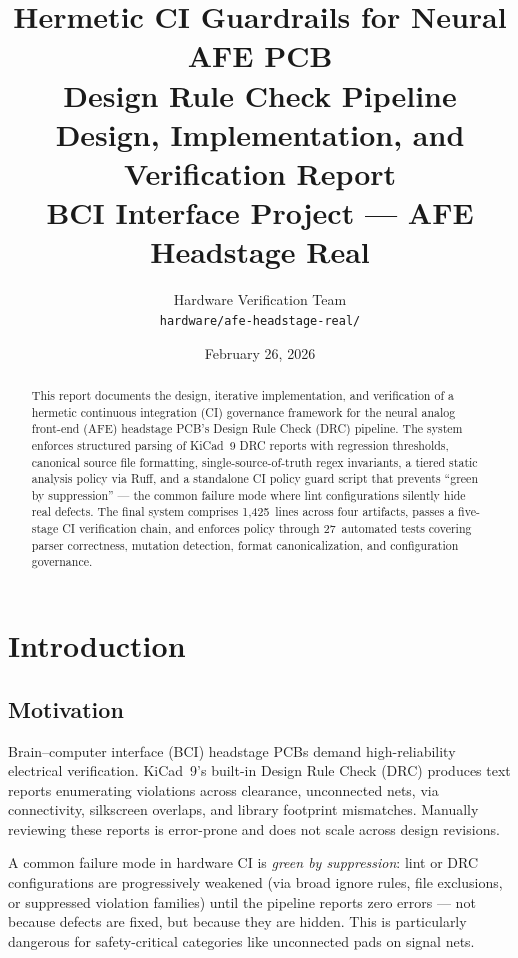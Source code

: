 \documentclass[11pt,a4paper]{article}
\title{%
    \textbf{Hermetic CI Guardrails for Neural AFE PCB\\Design Rule Check Pipeline}\\[0.5em]
    \large Design, Implementation, and Verification Report\\[0.3em]
    \normalsize BCI Interface Project --- AFE Headstage Real
}
\author{%
    Hardware Verification Team\\
    \texttt{hardware/afe-headstage-real/}
}
\date{February 26, 2026}
\begin{document}
\maketitle

\begin{abstract}
This report documents the design, iterative implementation, and verification of a
hermetic continuous integration (CI) governance framework for the neural analog
front-end (AFE) headstage PCB's Design Rule Check (DRC) pipeline. The system
enforces structured parsing of KiCad~9 DRC reports with regression thresholds,
canonical source file formatting, single-source-of-truth regex invariants,
a tiered static analysis policy via Ruff, and a standalone CI policy guard script
that prevents ``green by suppression'' --- the common failure mode where lint
configurations silently hide real defects. The final system comprises 1{,}425~lines
across four artifacts, passes a five-stage CI verification chain, and enforces
policy through 27~automated tests covering parser correctness, mutation detection,
format canonicalization, and configuration governance.
\end{abstract}

\tableofcontents
\newpage

\section{Introduction}
\label{sec:intro}

\subsection{Motivation}

Brain--computer interface (BCI) headstage PCBs demand high-reliability electrical
verification. KiCad~9's built-in Design Rule Check (DRC) produces text reports
enumerating violations across clearance, unconnected nets, via connectivity,
silkscreen overlaps, and library footprint mismatches. Manually reviewing these
reports is error-prone and does not scale across design revisions.

A common failure mode in hardware CI is \emph{green by suppression}: lint or DRC
configurations are progressively weakened (via broad ignore rules, file exclusions,
or suppressed violation families) until the pipeline reports zero errors --- not
because defects are fixed, but because they are hidden. This is particularly
dangerous for safety-critical categories like unconnected pads on signal nets.
\end{document}
